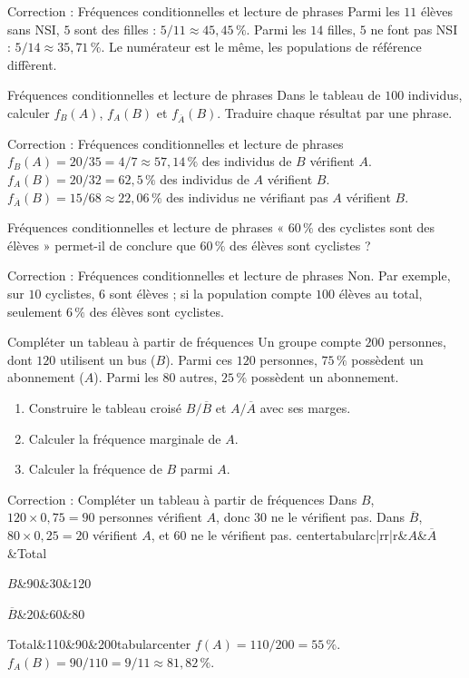 \documentclass[aspectratio=169,10pt]{beamer}
\begin{document}
\begin{frame}{Correction : Fréquences conditionnelles et lecture de phrases}
Parmi les \(11\) élèves sans NSI, \(5\) sont des filles : \(5/11\approx45{,}45\,\%\). Parmi les \(14\) filles, \(5\) ne font pas NSI : \(5/14\approx35{,}71\,\%\). Le numérateur est le même, les populations de référence diffèrent.
\end{frame}
\begin{frame}{Fréquences conditionnelles et lecture de phrases}
Dans le tableau de \(100\) individus, calculer \(f_B(A)\), \(f_A(B)\) et \(f_{\overline A}(B)\). Traduire chaque résultat par une phrase.
\end{frame}
\begin{frame}{Correction : Fréquences conditionnelles et lecture de phrases}
\(f_B(A)=20/35=4/7\approx57{,}14\,\%\) des individus de \(B\) vérifient \(A\). \(f_A(B)=20/32=62{,}5\,\%\) des individus de \(A\) vérifient \(B\). \(f_{\overline A}(B)=15/68\approx22{,}06\,\%\) des individus ne vérifiant pas \(A\) vérifient \(B\).
\end{frame}
\begin{frame}{Fréquences conditionnelles et lecture de phrases}
« \(60\,\%\) des cyclistes sont des élèves » permet-il de conclure que \(60\,\%\) des élèves sont cyclistes ?
\end{frame}
\begin{frame}{Correction : Fréquences conditionnelles et lecture de phrases}
Non. Par exemple, sur \(10\) cyclistes, \(6\) sont élèves ; si la population compte \(100\) élèves au total, seulement \(6\,\%\) des élèves sont cyclistes.
\end{frame}
\begin{frame}{Compléter un tableau à partir de fréquences}
Un groupe compte \(200\) personnes, dont \(120\) utilisent un bus (\(B\)). Parmi ces \(120\) personnes, \(75\,\%\) possèdent un abonnement (\(A\)). Parmi les \(80\) autres, \(25\,\%\) possèdent un abonnement.

\begin{enumerate}
\setcounter{enumi}{0}\item Construire le tableau croisé \(B/\overline B\) et \(A/\overline A\) avec ses marges.
\item Calculer la fréquence marginale de \(A\).
\item Calculer la fréquence de \(B\) parmi \(A\).

\end{enumerate}
\end{frame}
\begin{frame}{Correction : Compléter un tableau à partir de fréquences}
Dans \(B\), \(120\times0{,}75=90\) personnes vérifient \(A\), donc \(30\) ne le vérifient pas. Dans \(\overline B\), \(80\times0{,}25=20\) vérifient \(A\), et \(60\) ne le vérifient pas.
centertabularc|rr|r\&\(A\)\&\(\overline A\)\&Total

 \(B\)\&90\&30\&120

\(\overline B\)\&20\&60\&80

 Total\&110\&90\&200tabularcenter
\(f(A)=110/200=55\,\%\). \(f_A(B)=90/110=9/11\approx81{,}82\,\%\).
\end{frame}
\end{document}
